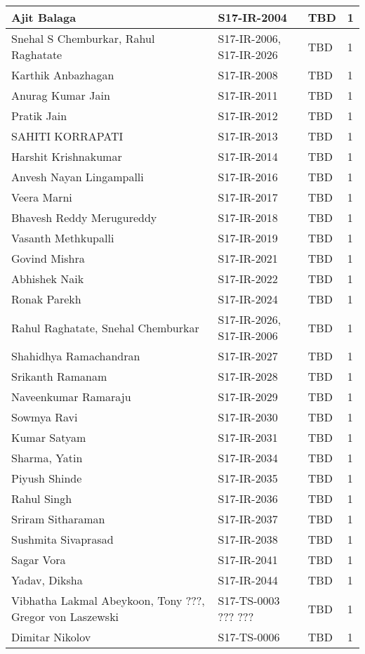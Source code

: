 \documentclass[12pt]{report}
\begin{document}
\begin{footnotesize}
\begin{tabular}{|llll|}
\hline
Ajit Balaga & S17-IR-2004 & TBD & 1 \\
\hline
Snehal S Chemburkar, Rahul Raghatate & S17-IR-2006, S17-IR-2026 & TBD & 1 \\
\hline
Karthik Anbazhagan & S17-IR-2008 & TBD & 1 \\
\hline
Anurag Kumar Jain & S17-IR-2011 & TBD & 1 \\
\hline
Pratik Jain & S17-IR-2012 & TBD & 1 \\
\hline
SAHITI KORRAPATI & S17-IR-2013 & TBD & 1 \\
\hline
Harshit Krishnakumar & S17-IR-2014 & TBD & 1 \\
\hline
Anvesh Nayan Lingampalli & S17-IR-2016 & TBD & 1 \\
\hline
Veera Marni & S17-IR-2017 & TBD & 1 \\
\hline
Bhavesh Reddy Merugureddy & S17-IR-2018 & TBD & 1 \\
\hline
Vasanth Methkupalli & S17-IR-2019 & TBD & 1 \\
\hline
Govind Mishra & S17-IR-2021 & TBD & 1 \\
\hline
Abhishek Naik & S17-IR-2022 & TBD & 1 \\
\hline
Ronak Parekh & S17-IR-2024 & TBD & 1 \\
\hline
Rahul Raghatate, Snehal Chemburkar & S17-IR-2026, S17-IR-2006 & TBD & 1 \\
\hline
Shahidhya Ramachandran & S17-IR-2027 & TBD & 1 \\
\hline
Srikanth Ramanam & S17-IR-2028 & TBD & 1 \\
\hline
Naveenkumar Ramaraju & S17-IR-2029 & TBD & 1 \\
\hline
Sowmya Ravi & S17-IR-2030 & TBD & 1 \\
\hline
Kumar Satyam & S17-IR-2031 & TBD & 1 \\
\hline
Sharma, Yatin & S17-IR-2034 & TBD & 1 \\
\hline
Piyush Shinde & S17-IR-2035 & TBD & 1 \\
\hline
Rahul Singh & S17-IR-2036 & TBD & 1 \\
\hline
Sriram Sitharaman & S17-IR-2037 & TBD & 1 \\
\hline
Sushmita Sivaprasad & S17-IR-2038 & TBD & 1 \\
\hline
Sagar Vora & S17-IR-2041 & TBD & 1 \\
\hline
Yadav, Diksha & S17-IR-2044 & TBD & 1 \\
\hline
Vibhatha Lakmal Abeykoon, Tony ???, Gregor von Laszewski & S17-TS-0003 ??? ??? & TBD & 1 \\
\hline
Dimitar Nikolov & S17-TS-0006 & TBD & 1 \\
\hline
\end{tabular}
\end{footnotesize}
\end{document}
